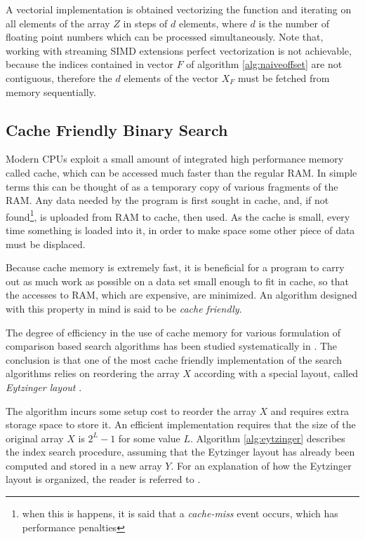 \documentclass[preprint,1p,times]{elsarticle}
\begin{document}
A vectorial implementation is obtained vectorizing the function and iterating on all elements of the 
array $Z$ in steps of $d$ elements, where $d$ is the number of floating point numbers which can be processed simultaneously. Note that, working with streaming SIMD extensions perfect vectorization is not achievable, because the indices contained in vector $F$ of algorithm \ref{alg:naiveoffset} are not contiguous, therefore the $d$ elements of the vector $X_F$ must be fetched from memory sequentially.

\subsection{Cache Friendly Binary Search}
Modern CPUs exploit a small amount of integrated high performance memory called cache, which can be accessed much faster than the regular RAM. In simple terms this can be thought of as a temporary copy of various fragments of the RAM. Any data needed by the program is first sought in cache, and, if not found\footnote{when this is happens, it is said that a \textit{cache-miss} event occurs, which has performance penalties}, is uploaded from RAM to cache, then used. As the cache is small, every time something is loaded into it, in order to make space some other piece of data must be displaced.

Because cache memory is extremely fast, it is beneficial for a program to carry out as much work as possible on a data set small enough to fit in cache, so that the accesses to RAM, which are expensive, are minimized. An algorithm designed with this property in mind is said to be \textit{cache friendly}. 

The degree of efficiency in the use of cache memory for various formulation of comparison based search algorithms has been studied systematically in \cite{Morin2015}. The conclusion is that one of the most cache friendly implementation of the search algorithms relies on reordering the array $X$ according with a special layout, called \textit{Eytzinger layout} \cite{Eytzinger1590}.

The algorithm incurs some setup cost to reorder the array $X$ and requires extra storage space to store it. An efficient implementation requires that the size of the original array $X$ is $2^L-1$ for some value $L$. Algorithm \ref{alg:eytzinger} describes the index search procedure, assuming that the Eytzinger layout has already been computed and stored in a new array $Y$. For an explanation of how the Eytzinger layout is organized, the reader is referred to \cite{Morin2015}.
\end{document}
